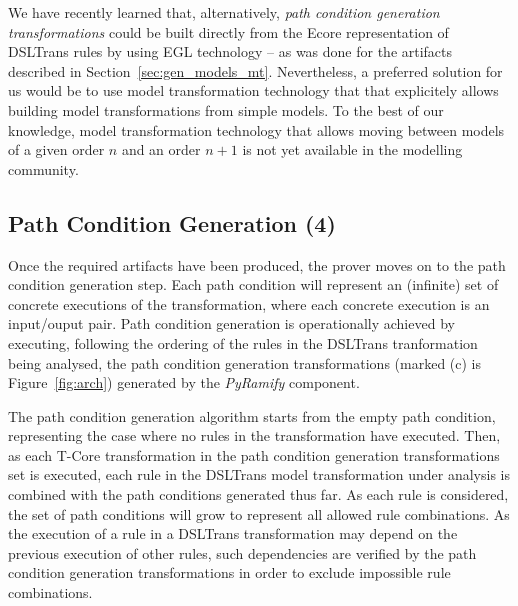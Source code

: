 We have recently learned that, alternatively, \emph{path condition generation
transformations} could be built directly from the Ecore representation of
DSLTrans rules by using EGL technology -- as was done for the artifacts
described in Section~\ref{sec:gen_models_mt}. Nevertheless, a preferred solution
for us would be to use model transformation technology that that explicitely
allows building model transformations from simple models. To the best of our
knowledge, model transformation technology that allows moving between models of
a given order $n$ and an order $n+1$ is not yet available in the modelling
community.

\subsection{Path Condition Generation (4)}
\label{sec:path_cond_gen}

Once the required artifacts have been produced, the prover moves
on to the path condition generation step. Each path condition will represent an
(infinite) set of concrete executions of the transformation, where each concrete
execution is an input/ouput pair. Path condition generation is operationally
achieved by executing, following the ordering of the rules in the DSLTrans
tranformation being analysed, the path condition generation transformations
(marked (c) is Figure~\ref{fig:arch}) generated by the \emph{PyRamify}
component.

The path condition generation algorithm starts from the empty path condition,
representing the case where no rules in the transformation have executed. Then,
as each T-Core transformation in the path condition generation
transformations set is executed, each rule in the
DSLTrans model transformation under analysis is combined with the path
conditions generated thus far. As each rule is considered, the set of path
conditions will grow to represent all allowed rule combinations.
As the execution of a rule in a DSLTrans transformation may depend on the
previous execution of other rules, such dependencies are verified by the path
condition generation transformations in order to exclude impossible rule
combinations.

